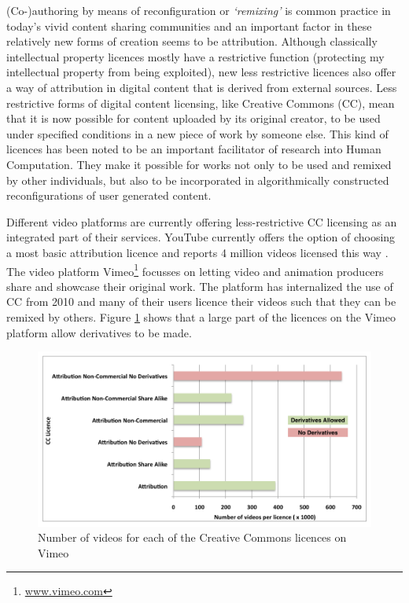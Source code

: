 (Co-)authoring by means of reconfiguration or \emph{`remixing'} is common practice in today's vivid content sharing communities \cite{Diakopoulos:2007jn} and an important factor in these relatively new forms of creation seems to be attribution\cite{Luther:2010wq}. Although classically intellectual property licences mostly have a restrictive function (protecting my intellectual property from being exploited), new less restrictive licences also offer a way of attribution in digital content that is derived from external sources. Less restrictive forms of digital content licensing, like Creative Commons (CC), mean that it is now possible for content uploaded by its original creator, to be used under specified conditions in a new piece of work by someone else. This kind of licences has been noted to be an important facilitator of research into Human Computation\cite{Law:2009vl}. They make it possible for works not only to be used and remixed by other individuals, but also to be incorporated in algorithmically constructed reconfigurations of user generated content.

Different video platforms are currently offering less-restrictive CC licensing as an integrated part of their services. YouTube currently offers the option of choosing a most basic attribution licence and reports 4 million videos licensed this way \cite{YouTubeCC}. The video platform Vimeo\footnote{\url{www.vimeo.com}} focusses on letting video and animation producers share and showcase their original work. The platform has internalized the use of CC from 2010\cite{vimeoTimeline} and many of their users licence their videos such that they can be remixed by others. Figure \ref{fig:vimeoCC} shows that a large part of the licences on the Vimeo platform allow derivatives to be made\cite{vimeoCC}.

\begin{figure}[htbp]
  \centering
    \includegraphics[scale=1]{img/vimeoCC}
  \caption{Number of videos for each of the Creative Commons licences on Vimeo}
  \label{fig:vimeoCC}
\end{figure}

